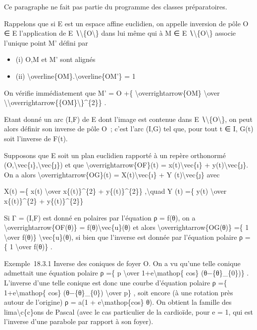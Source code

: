 \documentclass[]{article}
\begin{document}
Ce paragraphe ne fait pas partie du programme des classes préparatoires.

Rappelons que si E est un espace affine euclidien, on appelle inversion
de pôle O ∈ E l'application de E ∖\textbackslash{}\{O\textbackslash{}\}
dans lui même qui à M ∈ E ∖\textbackslash{}\{O\textbackslash{}\} associe
l'unique point M' défini par

\begin{itemize}
\itemsep1pt\parskip0pt
\item
  (i) O,M et M' sont alignés
\item
  (ii) \textbackslash{}overline\{OM\}.\textbackslash{}overline\{OM'\} =
  1
\end{itemize}

On vérifie immédiatement que M' = O +\{
\textbackslash{}overrightarrow\{OM\} \textbackslash{}over
\textbackslash{}\textbar{}\textbackslash{}overrightarrow\{\{OM\}\textbackslash{}\textbar{}\}\^{}\{2\}\}
.

Etant donné un arc (I,F) de E dont l'image est contenue dans E
∖\textbackslash{}\{O\textbackslash{}\}, on peut alors définir son
inverse de pôle O~; c'est l'arc (I,G) tel que, pour tout t ∈ I, G(t)
soit l'inverse de F(t).

Supposons que E soit un plan euclidien rapporté à un repère orthonormé
(O,\textbackslash{}vec\{ı\},\textbackslash{}vec\{ȷ\}) et que
\textbackslash{}overrightarrow\{OF\}(t) = x(t)\textbackslash{}vec\{ı\} +
y(t)\textbackslash{}vec\{ȷ\}. On a alors
\textbackslash{}overrightarrow\{OG\}(t) = X(t)\textbackslash{}vec\{ı\} +
Y (t)\textbackslash{}vec\{ȷ\} avec

X(t) =\{ x(t) \textbackslash{}over x\{(t)\}\^{}\{2\} +
y\{(t)\}\^{}\{2\}\} ,\textbackslash{}quad Y (t) =\{ y(t)
\textbackslash{}over x\{(t)\}\^{}\{2\} + y\{(t)\}\^{}\{2\}\}

Si Γ = (I,F) est donné en polaires par l'équation ρ = f(θ), on a
\textbackslash{}overrightarrow\{OF(θ)\} =
f(θ)\textbackslash{}vec\{u\}(θ) et alors
\textbackslash{}overrightarrow\{OG(θ)\} =\{ 1 \textbackslash{}over
f(θ)\} \textbackslash{}vec\{u\}(θ), si bien que l'inverse est donnée par
l'équation polaire ρ =\{ 1 \textbackslash{}over f(θ)\} .

Exemple~18.3.1 Inverse des coniques de foyer O. On a vu qu'une telle
conique admettait une équation polaire ρ =\{ p \textbackslash{}over
1+e\textbackslash{}mathop\{ cos\} (θ−\{θ\}\_\{0\})\} . L'inverse d'une
telle conique est donc une courbe d'équation polaire ρ =\{
1+e\textbackslash{}mathop\{ cos\} (θ−\{θ\}\_\{0\}) \textbackslash{}over
p\} , soit encore (à une rotation près autour de l'origine) ρ = a(1 +
e\textbackslash{}mathop\{cos\} θ). On obtient la famille des
lima\textbackslash{}c\{c\}ons de Pascal (avec le cas particulier de la
cardioïde, pour e = 1, qui est l'inverse d'une parabole par rapport à
son foyer).
\end{document}
